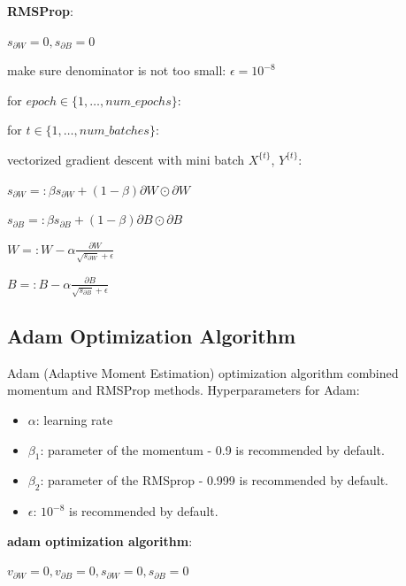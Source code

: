 \documentclass{article}
\begin{document}
\noindent \textbf{RMSProp}:

\noindent \(s_{\partial W} = 0, s_{\partial B} = 0\)

\noindent make sure denominator is not too small: \(\epsilon = 10^{-8}\)

\noindent for \(epoch \in \{1, \dots, num\_epochs\}\):

\noindent \hspace{.5cm} for \(t \in \{1, \dots, num\_batches\}\):

\noindent \hspace{1cm} vectorized gradient descent with mini batch \(X^{\{t\}}\), \(Y^{\{t\}}\):

\noindent \hspace{1cm} \(s_{\partial W} =: \beta s_{\partial W} + (1 - \beta) \partial W \odot \partial W\)

\noindent \hspace{1cm} \(s_{\partial B} =: \beta s_{\partial B} + (1 - \beta) \partial B \odot \partial B\)

\noindent \hspace{1cm} \(W =: W - \alpha \frac{\partial W}{\sqrt{s_{\partial W}} + \epsilon}\)

\noindent \hspace{1cm} \(B =: B - \alpha \frac{\partial B}{\sqrt{s_{\partial B}} + \epsilon}\)

\subsection{Adam Optimization Algorithm}

\noindent Adam (Adaptive Moment Estimation) optimization algorithm combined momentum and RMSProp methods. Hyperparameters for Adam:

\begin{itemize}
    \item \(\alpha\): learning rate
    \item \(\beta_{1}\): parameter of the momentum - 0.9 is recommended by default.
    \item \(\beta_{2}\): parameter of the RMSprop - 0.999 is recommended by default.
    \item \(\epsilon\): \(10^{-8}\) is recommended by default.
\end{itemize}

\noindent \textbf{adam optimization algorithm}:

\noindent \(v_{\partial W} = 0, v_{\partial B} = 0, s_{\partial W} = 0, s_{\partial B} = 0\)
\end{document}
